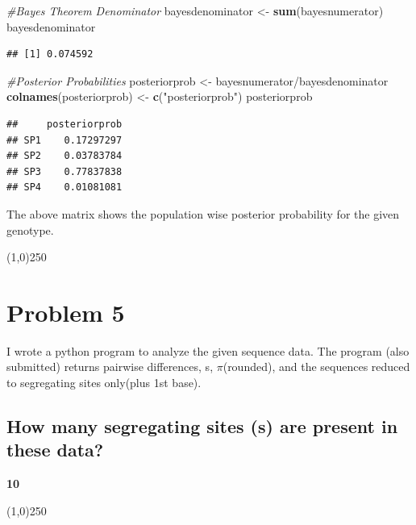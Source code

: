 \documentclass[]{article}
\newenvironment{Shaded}{\begin{snugshade}}{\end{snugshade}}
\newcommand{\KeywordTok}[1]{\textcolor[rgb]{0.13,0.29,0.53}{\textbf{{#1}}}}
\newcommand{\StringTok}[1]{\textcolor[rgb]{0.31,0.60,0.02}{{#1}}}
\newcommand{\CommentTok}[1]{\textcolor[rgb]{0.56,0.35,0.01}{\textit{{#1}}}}
\newcommand{\NormalTok}[1]{{#1}}
\begin{document}
\begin{Shaded}
\begin{Highlighting}[]
\CommentTok{#Bayes Theorem Denominator}
\NormalTok{bayesdenominator <-}\StringTok{ }\KeywordTok{sum}\NormalTok{(bayesnumerator)}
\NormalTok{bayesdenominator}
\end{Highlighting}
\end{Shaded}

\begin{verbatim}
## [1] 0.074592
\end{verbatim}

\begin{Shaded}
\begin{Highlighting}[]
\CommentTok{#Posterior Probabilities}
\NormalTok{posteriorprob <-}\StringTok{ }\NormalTok{bayesnumerator/bayesdenominator}
\KeywordTok{colnames}\NormalTok{(posteriorprob) <-}\StringTok{ }\KeywordTok{c}\NormalTok{(}\StringTok{"posteriorprob"}\NormalTok{)}
\NormalTok{posteriorprob}
\end{Highlighting}
\end{Shaded}

\begin{verbatim}
##     posteriorprob
## SP1    0.17297297
## SP2    0.03783784
## SP3    0.77837838
## SP4    0.01081081
\end{verbatim}

The above matrix shows the population wise posterior probability for the
given genotype.

\begin{center}
\line(1,0){250}
\end{center}

\section{Problem 5}\label{problem-5}

I wrote a python program to analyze the given sequence data. The program
(also submitted) returns pairwise differences, s, $\pi$(rounded), and
the sequences reduced to segregating sites only(plus 1st base).

\subsection{How many segregating sites (s) are present in these
data?}\label{how-many-segregating-sites-s-are-present-in-these-data}

\textbf{10}

\begin{center}
\line(1,0){250}
\end{center}
\end{document}

